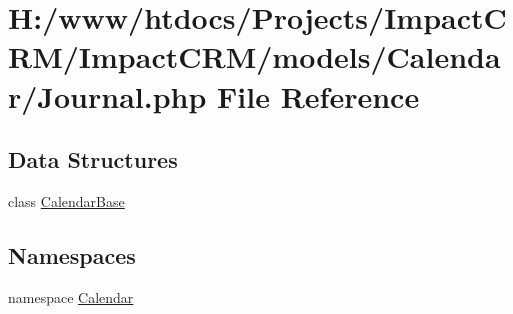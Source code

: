 \hypertarget{Journal_8php}{
\section{H:/www/htdocs/Projects/ImpactCRM/ImpactCRM/models/Calendar/Journal.php File Reference}
\label{Journal_8php}
}
\subsection*{Data Structures}
\begin{DoxyCompactItemize}
\item 
class \hyperlink{classCalendarBase}{CalendarBase}
\end{DoxyCompactItemize}
\subsection*{Namespaces}
\begin{DoxyCompactItemize}
\item 
namespace \hyperlink{namespaceCalendar}{Calendar}
\end{DoxyCompactItemize}
